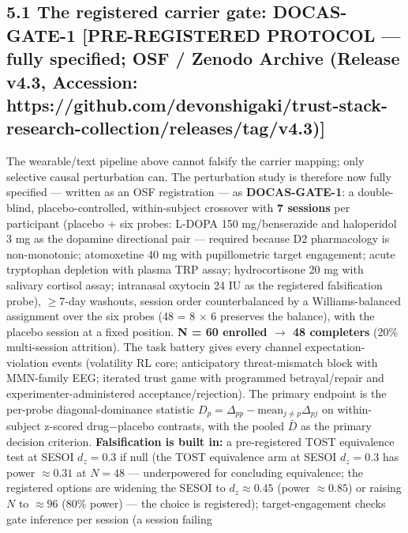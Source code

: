\documentclass[
]{article}
\begin{document}
\subsection{5.1 The registered carrier gate: DOCAS-GATE-1
{[}PRE-REGISTERED PROTOCOL --- fully specified; OSF / Zenodo Archive
(Release v4.3, Accession:
https://github.com/devonshigaki/trust-stack-research-collection/releases/tag/v4.3){]}}\label{the-registered-carrier-gate-docas-gate-1-pre-registered-protocol-fully-specified-osf-zenodo-archive-release-v4.3-accession-httpsgithub.comdevonshigakitrust-stack-research-collectionreleasestagv4.3}

The wearable/text pipeline above cannot falsify the carrier mapping;
only selective causal perturbation can. The perturbation study is
therefore now fully specified --- written as an OSF registration --- as
\textbf{DOCAS-GATE-1}: a double-blind, placebo-controlled,
within-subject crossover with \textbf{7 sessions} per participant
(placebo + six probes: L-DOPA 150 mg/benserazide and haloperidol 3 mg as
the dopamine directional pair --- required because D2 pharmacology is
non-monotonic; atomoxetine 40 mg with pupillometric target engagement;
acute tryptophan depletion with plasma TRP assay; hydrocortisone 20 mg
with salivary cortisol assay; intranasal oxytocin 24 IU as the
registered falsification probe), \(\geq\)7-day washouts, session order
counterbalanced by a Williams-balanced assignment over the six probes
(48 = 8 \(\times\) 6 preserves the balance), with the placebo session at
a fixed position. \textbf{N = 60 enrolled \(\to\) 48 completers} (20\%
multi-session attrition). The task battery gives every channel
expectation-violation events (volatility RL core; anticipatory
threat-mismatch block with MMN-family EEG; iterated trust game with
programmed betrayal/repair and experimenter-administered
acceptance/rejection). The primary endpoint is the per-probe
diagonal-dominance statistic
\(D_p = \Delta_{pp} - \mathrm{mean}_{j \neq p}\Delta_{pj}\) on
within-subject z-scored drug\(-\)placebo contrasts, with the pooled
\(\bar{D}\) as the primary decision criterion. \textbf{Falsification is
built in:} a pre-registered TOST equivalence test at SESOI \(d_z = 0.3\)
if null (the TOST equivalence arm at SESOI \(d_z = 0.3\) has power
\(\approx 0.31\) at \(N = 48\) --- underpowered for concluding
equivalence; the registered options are widening the SESOI to
\(d_z \approx 0.45\) (power \(\approx 0.85\)) or raising \(N\) to
\(\approx 96\) (80\% power) --- the choice is registered);
target-engagement checks gate inference per session (a session failing
\end{document}
